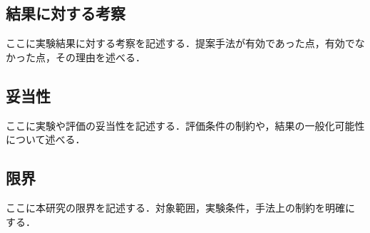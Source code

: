 \subsection{結果に対する考察}
ここに実験結果に対する考察を記述する．提案手法が有効であった点，有効でなかった点，その理由を述べる．

\subsection{妥当性}
ここに実験や評価の妥当性を記述する．評価条件の制約や，結果の一般化可能性について述べる．

\subsection{限界}
ここに本研究の限界を記述する．対象範囲，実験条件，手法上の制約を明確にする．

